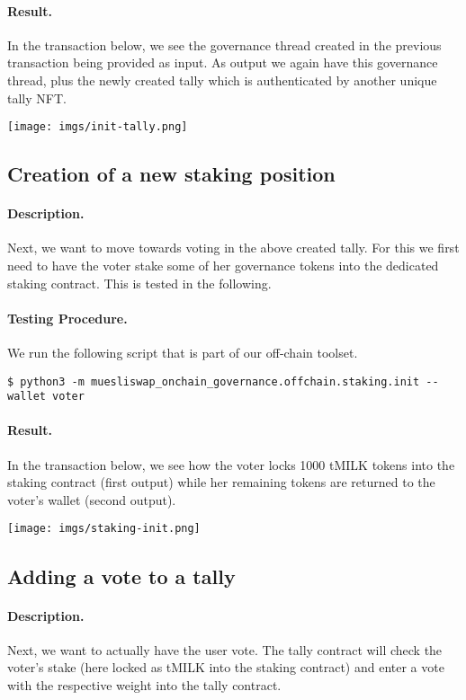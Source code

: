 \documentclass[11pt]{article}
\begin{document}
\paragraph{Result.} In the transaction below, we see the governance thread created in the previous transaction being provided as input. As output we again have this governance thread, plus the newly created tally which is authenticated by another unique tally NFT.
\bigskip

\texttt{[image: imgs/init-tally.png]}


\subsection{Creation of a new staking position}
\paragraph{Description.} Next, we want to move towards voting in the above created tally. For this we first need to have the voter stake some of her governance tokens into the dedicated staking contract. This is tested in the following.

\paragraph{Testing Procedure.} We run the following script that is part of our off-chain toolset.
\begin{verbatim}
$ python3 -m muesliswap_onchain_governance.offchain.staking.init --wallet voter
\end{verbatim}

\paragraph{Result.} In the transaction below, we see how the voter locks 1000 tMILK tokens into the staking contract (first output) while her remaining tokens are returned to the voter's wallet (second output).
\bigskip

\texttt{[image: imgs/staking-init.png]}

\subsection{Adding a vote to a tally}

\paragraph{Description.} Next, we want to actually have the user vote. The tally contract will check the voter's stake (here locked as tMILK into the staking contract) and enter a vote with the respective weight into the tally contract.
\end{document}
